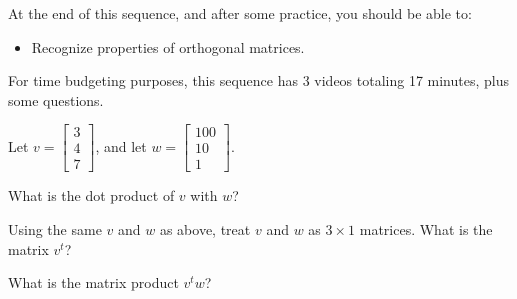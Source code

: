







At the end of this sequence, and after some practice, you should be able to:

\begin{itemize}
\item Recognize properties of orthogonal matrices. 
\end{itemize}


For time budgeting purposes, this sequence has 3 videos totaling 17 minutes, 
plus some questions.  




\endedxtext

\endedxvertical






Let $v = \left[ \begin{array}{c} 3 \\ 4 \\ 7 \end{array} \right]$, and let $w  = \left[ \begin{array}{cc} 100  \\ 10  \\ 1  \end{array} \right]$.  


What is the dot product of $v$ with $w$?  




\endedxproblem



Using the same $v$ and $w$ as above,  treat $v$ and $w$ as  $3\times 1$ matrices.  What is the matrix $v^t$?   






What is the matrix product $v^t w$?  







